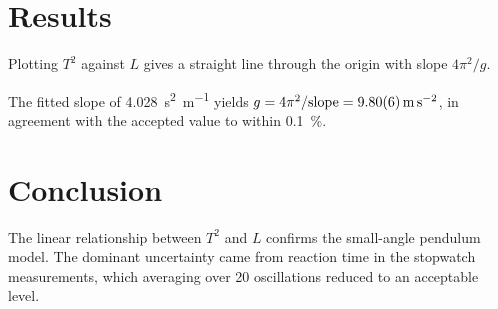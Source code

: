 \documentclass[11pt]{article}
\begin{document}
\section*{Results}
Plotting $T^2$ against $L$ gives a straight line through the origin with slope
$4\pi^2/g$.

\begin{center}
\end{center}

The fitted slope of \SI{4.028}{\second\squared\per\metre} yields
$g = 4\pi^2/\text{slope} = \SI{9.80\pm0.06}{\metre\per\second\squared}$,
in agreement with the accepted value to within \SI{0.1}{\percent}.

\section*{Conclusion}
The linear relationship between $T^2$ and $L$ confirms the small-angle
pendulum model. The dominant uncertainty came from reaction time in the
stopwatch measurements, which averaging over 20 oscillations reduced to an
acceptable level.
\end{document}
